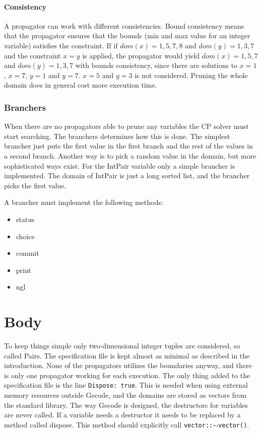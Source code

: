 \documentclass[a4paper,11pt]{article}
\begin{document}
\paragraph{Consistency}
A propagator can work with different consistencies. Bound consistency means that the propagator ensures that the bounds (min and max value for an integer variable) satisfies the constraint. If if $dom(x)={1,5,7,8}$ and $dom(y)={1,3,7}$ and the constraint $x=y$ is applied, the propagator would yield $dom(x)={1,5,7}$ and $dom(y)={1,3,7}$ with bounds consistency, since there are solutions to $x=1$, $x=7$, $y=1$ and $y=7$. $x=5$ and $y=3$ is not considered. Pruning the whole domain does in general cost more execution time.

\subsubsection{Branchers}
When there are no propagators able to prune any variables the CP solver must start searching. The branchers determines how this is done. The simplest brancher just puts the first value in the first branch and the rest of the values in a second branch. Another way is to pick a random value in the domain, but more sophisticated ways exist. For the IntPair variable only a simple brancher is implemented. The domain of IntPair is just a long sorted list, and the brancher picks the first value.

A brancher must implement the following methods:
\begin{itemize}
\item{status}
\item{choice}
\item{commit}
\item{print}
\item{ngl}
\end{itemize}

\section{Body}
To keep things simple only two-dimensional integer tuples are considered, so called Pairs. The specification file is kept almost as minimal as described in the introduction. None of the propagators utilizes the boundaries anyway, and there is only one propagator working for each execution. The only thing added to the specification file is the line \texttt{Dispose: true}. This is needed when using external memory resources outside Gecode, and the domains are stored as vectors from the standard library. The way Gecode is designed, the destructors for variables are never called. If a variable needs a destructor it needs to be replaced by a method called dispose. This method should explicitly call \texttt{vector::$\sim$vector()}.
\end{document}
